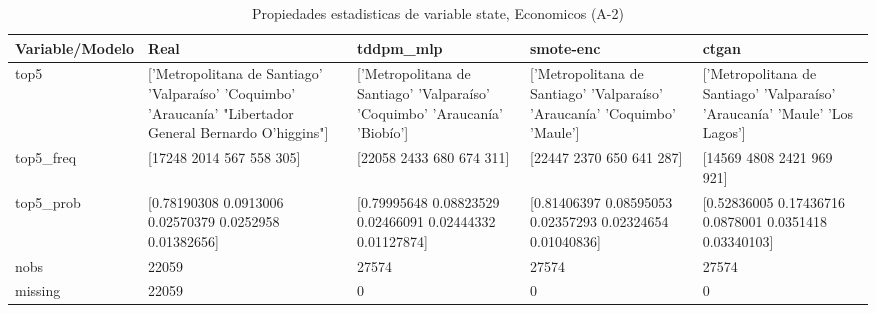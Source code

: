 \begin{table}[H]
\centering
\fontsize{8}{14}\selectfont
\caption{Propiedades  estadisticas de variable state, Economicos (A-2)}
\label{table-stats-economicos-a-2-state}
\begin{tabular}{|l|m{10em}|m{10em}|m{10em}|m{10em}|}
\hline
 \rowcolor[gray]{0.8}
Variable/Modelo & Real & tddpm\_mlp & smote-enc & ctgan \\
\hline top5 & ['Metropolitana de Santiago' 'Valparaíso' 'Coquimbo' 'Araucanía'
 "Libertador General Bernardo O'higgins"] & ['Metropolitana de Santiago' 'Valparaíso' 'Coquimbo' 'Araucanía' 'Biobío'] & ['Metropolitana de Santiago' 'Valparaíso' 'Araucanía' 'Coquimbo' 'Maule'] & ['Metropolitana de Santiago' 'Valparaíso' 'Araucanía' 'Maule' 'Los Lagos'] \\
\hline top5\_freq & [17248  2014   567   558   305] & [22058  2433   680   674   311] & [22447  2370   650   641   287] & [14569  4808  2421   969   921] \\
\hline top5\_prob & [0.78190308 0.0913006  0.02570379 0.0252958  0.01382656] & [0.79995648 0.08823529 0.02466091 0.02444332 0.01127874] & [0.81406397 0.08595053 0.02357293 0.02324654 0.01040836] & [0.52836005 0.17436716 0.0878001  0.0351418  0.03340103] \\
\hline nobs & 22059 & 27574 & 27574 & 27574 \\
\hline missing & 22059 & 0 & 0 & 0 \\
\hline
\end{tabular}
\end{table}
